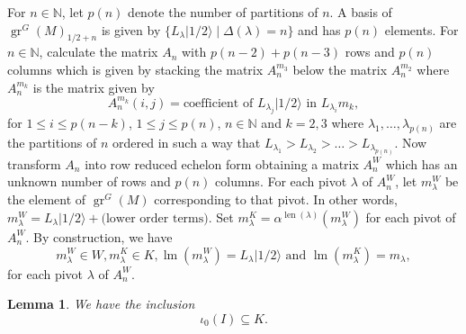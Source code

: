\documentclass[12pt, a4paper]{article}
\newtheorem{lemma}{Lemma}
\DeclareMathOperator{\gr}{gr}
\DeclareMathOperator{\lm}{lm}
\DeclareMathOperator{\len}{len}
\newcommand{\vachalf}{|1/2\rangle}
\begin{document}
For $n \in \mathbb{N}$, let $p(n)$ denote the number of partitions of $n$.
A basis of $\gr^G(M)_{1/2 + n}$ is given by $\{L_\lambda\vachalf \mid \Delta(\lambda) = n\}$ and has $p(n)$ elements. 
For $n\in \mathbb{N}$, calculate the matrix $A_n$ with $p(n - 2) + p(n - 3)$ rows and $p(n)$ columns which is given by stacking the matrix $A^{m_3}_n$ below the matrix $A^{m_2}_n$ where $A^{m_k}_n$ is the matrix given by
\begin{equation*}
  A^{m_k}_n(i, j) = \text{coefficient of }L_{\lambda_j}\vachalf\text{ in }L_{\lambda_i}m_k,
\end{equation*}
for $1 \le i \le p(n - k)$, $1 \le j \le p(n)$, $n \in \mathbb{N}$ and $k = 2, 3$ where $\lambda_1, \dots, \lambda_{p(n)}$ are the partitions of $n$ ordered in such a way that $L_{\lambda_1} > L_{\lambda_2} > \dots > L_{\lambda_{p(n)}}$.
Now transform $A_n$ into row reduced echelon form obtaining a matrix $A^W_n$ which has an unknown number of rows and $p(n)$ columns.
For each pivot $\lambda$ of $A^W_n$, let $m^W_\lambda$ be the element of $\gr^G(M)$ corresponding to that pivot.
In other words, $m^W_\lambda = L_\lambda\vachalf + \text{(lower order terms)}$.
Set $m^K_\lambda = \alpha^{\len(\lambda)}(m^W_\lambda)$ for each pivot of $A^W_n$.
By construction, we have
\begin{equation*}
  m^W_\lambda \in W, m^K_\lambda \in K, \lm(m^W_\lambda) = L_\lambda\vachalf\text{ and }\lm(m^K_\lambda) = m_\lambda,
\end{equation*}
for each pivot $\lambda$ of $A^W_n$.

\begin{lemma}
  \label{lmm:10}
  We have the inclusion
  \begin{equation*}
    \iota_0(I) \subseteq K.
  \end{equation*}
\end{lemma}
\end{document}
